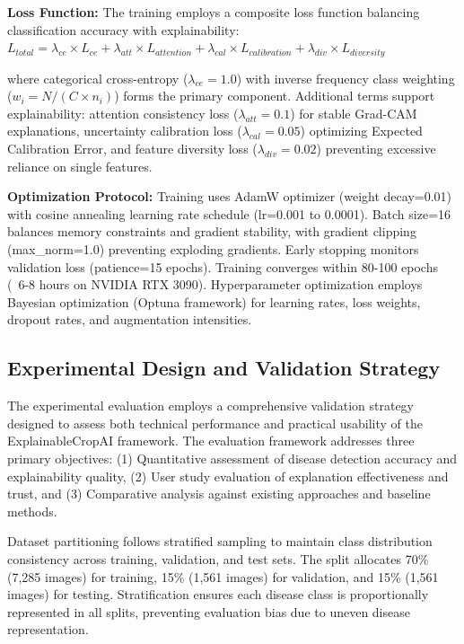 \documentclass[agriculture,article,submit,pdftex,moreauthors]{Definitions/mdpi}
\begin{document}
\textbf{Loss Function:} The training employs a composite loss function balancing classification accuracy with explainability:
$L_{total} = \lambda_{ce} \times L_{ce} + \lambda_{att} \times L_{attention} + \lambda_{cal} \times L_{calibration} + \lambda_{div} \times L_{diversity}$

where categorical cross-entropy ($\lambda_{ce} = 1.0$) with inverse frequency class weighting ($w_i = N/(C \times n_i)$) forms the primary component. Additional terms support explainability: attention consistency loss ($\lambda_{att} = 0.1$) for stable Grad-CAM explanations, uncertainty calibration loss ($\lambda_{cal} = 0.05$) optimizing Expected Calibration Error, and feature diversity loss ($\lambda_{div} = 0.02$) preventing excessive reliance on single features.

\textbf{Optimization Protocol:} Training uses AdamW optimizer (weight decay=0.01) with cosine annealing learning rate schedule (lr=0.001 to 0.0001). Batch size=16 balances memory constraints and gradient stability, with gradient clipping (max_norm=1.0) preventing exploding gradients. Early stopping monitors validation loss (patience=15 epochs). Training converges within 80-100 epochs (~6-8 hours on NVIDIA RTX 3090). Hyperparameter optimization employs Bayesian optimization (Optuna framework) for learning rates, loss weights, dropout rates, and augmentation intensities.

\subsection{Experimental Design and Validation Strategy}

The experimental evaluation employs a comprehensive validation strategy designed to assess both technical performance and practical usability of the ExplainableCropAI framework. The evaluation framework addresses three primary objectives: (1) Quantitative assessment of disease detection accuracy and explainability quality, (2) User study evaluation of explanation effectiveness and trust, and (3) Comparative analysis against existing approaches and baseline methods.


Dataset partitioning follows stratified sampling to maintain class distribution consistency across training, validation, and test sets. The split allocates 70\% (7,285 images) for training, 15\% (1,561 images) for validation, and 15\% (1,561 images) for testing. Stratification ensures each disease class is proportionally represented in all splits, preventing evaluation bias due to uneven disease representation.
\end{document}
